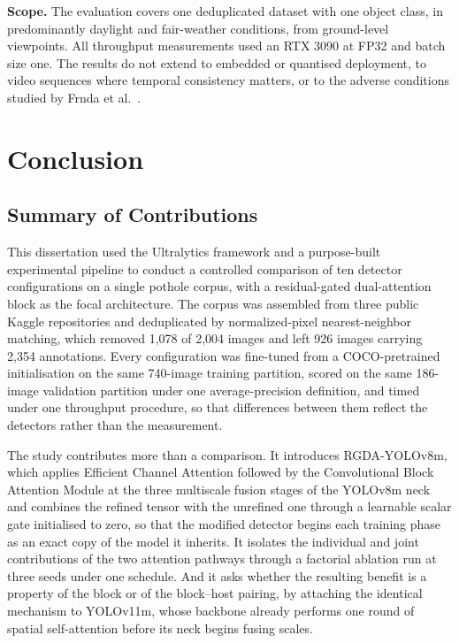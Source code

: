 \documentclass[MScCS]{uccthesis}
\begin{document}
\textbf{Scope.} The evaluation covers one deduplicated dataset with one object
class, in predominantly daylight and fair-weather conditions, from ground-level
viewpoints. All throughput measurements used an RTX 3090 at FP32 and batch size
one. The results do not extend to embedded or quantised deployment, to video
sequences where temporal consistency matters, or to the adverse conditions
studied by Frnda et al.~\parencite{frnda2024analysis}.



\chapter{Conclusion}
\label{ch:conclusion}


\section{Summary of Contributions}
\label{sec:conc_contributions}

This dissertation used the Ultralytics framework and a purpose-built experimental
pipeline to conduct a controlled comparison of ten detector configurations on a
single pothole corpus, with a residual-gated dual-attention block as the focal
architecture. The corpus was assembled from three public Kaggle repositories and
deduplicated by normalized-pixel nearest-neighbor matching, which removed 1,078
of 2,004 images and left 926 images carrying 2,354 annotations. Every
configuration was fine-tuned from a COCO-pretrained initialisation on the same
740-image training partition, scored on the same 186-image validation partition
under one average-precision definition, and timed under one throughput
procedure, so that differences between them reflect the detectors rather than
the measurement.

The study contributes more than a comparison. It introduces RGDA-YOLOv8m, which
applies Efficient Channel Attention followed by the Convolutional Block
Attention Module at the three multiscale fusion stages of the YOLOv8m neck and
combines the refined tensor with the unrefined one through a learnable scalar
gate initialised to zero, so that the modified detector begins each training
phase as an exact copy of the model it inherits. It isolates the individual and
joint contributions of the two attention pathways through a factorial ablation
run at three seeds under one schedule. And it asks whether the resulting benefit
is a property of the block or of the block--host pairing, by attaching the
identical mechanism to YOLOv11m, whose backbone already performs one round of
spatial self-attention before its neck begins fusing scales.
\end{document}
